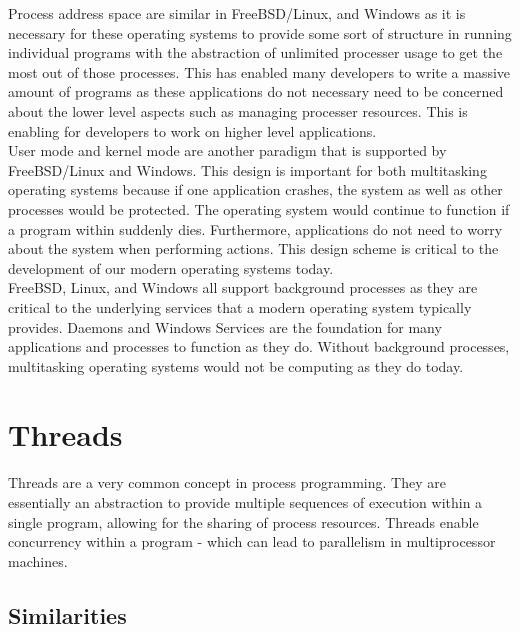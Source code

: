 \documentclass[letterpaper,10pt,titlepage]{article}
\begin{document}
Process address space are similar in FreeBSD/Linux, and Windows as it is necessary for these operating systems to provide some sort of structure in running individual programs with the abstraction of unlimited processer usage to get the most out of those processes.  This has enabled many developers to write a massive amount of programs as these applications do not necessary need to be concerned about the lower level aspects such as managing processer resources.  This is enabling for developers to work on higher level applications.\\

User mode and kernel mode are another paradigm that is supported by FreeBSD/Linux and Windows.  This design is important for both multitasking operating systems because if one application crashes, the system as well as other processes would be protected.  The operating system would continue to function if a program within suddenly dies.  Furthermore, applications do not need to worry about the system when performing actions.  This design scheme is critical to the development of our modern operating systems today.\\

FreeBSD, Linux, and Windows all support background processes as they are critical to the underlying services that a modern operating system typically provides.  Daemons and Windows Services are the foundation for many applications and processes to function as they do.  Without background processes, multitasking operating systems would not be computing as they do today.\\

\section{Threads}

Threads are a very common concept in process programming.  They are essentially an abstraction to provide multiple sequences of execution within a single program, allowing for the sharing of process resources.  Threads enable concurrency within a program - which can lead to parallelism in multiprocessor machines.

\subsection{Similarities}
\end{document}
